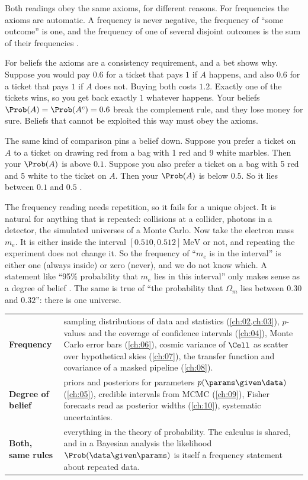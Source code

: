 Both readings obey the same axioms, for different reasons. For frequencies
the axioms are automatic. A frequency is never negative, the frequency of
``some outcome'' is one, and the frequency of one of several disjoint outcomes
is the sum of their frequencies .

For beliefs the axioms are a consistency requirement, and a bet shows why.
Suppose you would pay $0.6$ for a ticket that pays $1$ if $A$ happens, and also
$0.6$ for a ticket that pays $1$ if $A$ does not. Buying both costs $1.2$.
Exactly one of the tickets wins, so you get back exactly $1$ whatever happens.
Your beliefs $\Prob(A)=\Prob(A^c)=0.6$ break the complement rule, and they lose
money for sure. Beliefs that cannot be exploited this way must obey the axioms.

The same kind of comparison pins a belief down. Suppose you prefer a ticket on
$A$ to a ticket on drawing red from a bag with 1 red and 9 white marbles. Then
your $\Prob(A)$ is above $0.1$. Suppose you also prefer a ticket on a bag with 5
red and 5 white to the ticket on $A$. Then your $\Prob(A)$ is below $0.5$. So it
lies between $0.1$ and $0.5$ .

The frequency reading needs repetition, so it fails for a unique object. It is
natural for anything that is repeated: collisions at a collider, photons in a
detector, the simulated universes of a Monte Carlo. Now take the electron mass
$m_e$. It is either inside the interval $[0.510,0.512]\,\text{MeV}$ or not, and
repeating the experiment does not change it. So the frequency of ``$m_e$ is in
the interval'' is either one (always inside) or zero (never), and we do not know
which. A statement like ``95\%
probability that $m_e$ lies in this interval'' only makes sense as a degree of
belief . The same is true of ``the probability that
$\Omega_m$ lies between $0.30$ and $0.32$'': there is one universe.

\begin{taxonomy}
\begin{tabularx}{\linewidth}{@{}>{\raggedright}p{3.2cm}X@{}}
\toprule
\textbf{Frequency} & sampling distributions of data and statistics
(\cref{ch:02,ch:03}), $p$-values and the coverage of confidence intervals
(\cref{ch:04}), Monte Carlo error bars (\cref{ch:06}), cosmic variance of
$\Cell$ as scatter over hypothetical skies (\cref{ch:07}), the transfer
function and covariance of a masked pipeline (\cref{ch:08}).\\
\addlinespace
\textbf{Degree of belief} & priors and posteriors for parameters
$p(\params\given\data)$ (\cref{ch:05}), credible intervals from MCMC
(\cref{ch:09}), Fisher forecasts read as posterior widths (\cref{ch:10}),
systematic uncertainties.\\
\addlinespace
\textbf{Both, same rules} & everything in the theory of probability. The calculus is
shared, and in a Bayesian analysis the likelihood $\Prob(\data\given\params)$ is
itself a frequency statement about repeated data.\\
\bottomrule
\end{tabularx}
\end{taxonomy}

